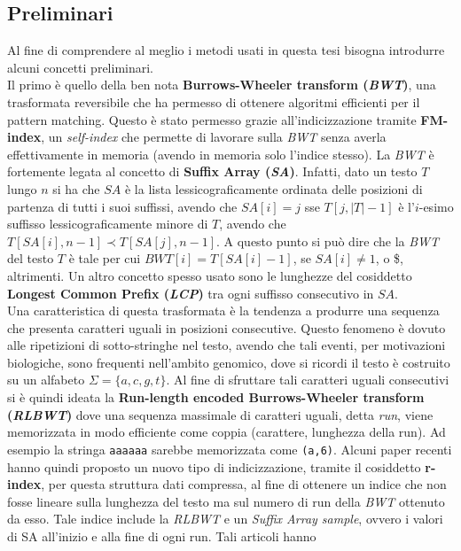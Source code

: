 \documentclass[a4paper,11pt, oneside]{article}
\begin{document}
\subsection*{Preliminari}
Al fine di comprendere al meglio i metodi usati in questa tesi bisogna
introdurre alcuni concetti preliminari.\\
Il primo è quello della ben nota \textbf{Burrows-Wheeler transform
  (\textit{BWT})}, una trasformata reversibile che ha permesso di ottenere
algoritmi efficienti per il pattern matching. Questo è stato permesso grazie
all'indicizzazione tramite 
\textbf{FM-index}, un \textit{self-index} che permette di lavorare sulla
\textit{BWT} senza averla effettivamente in memoria (avendo in memoria solo
l'indice stesso). La \textit{BWT} è fortemente legata al concetto di
\textbf{Suffix Array (\textit{SA})}. Infatti, dato un testo $T$ lungo $n$ si ha
che $SA$ è la lista lessicograficamente ordinata delle posizioni di partenza di
tutti i suoi suffissi, avendo che $SA[i]=j$ sse $T[j, |T|-1]$ è l'$i$-esimo
suffisso lessicograficamente minore di $T$, avendo che $T[SA[i],n-1] \prec
T[SA[j],n-1]$. A questo punto si può dire che la \textit{BWT} del testo $T$ è
tale per cui $BWT[i]=T[SA[i]-1]$, se $SA[i]\neq 1$, o \$, altrimenti. Un altro
concetto spesso usato 
sono le lunghezze del cosiddetto \textbf{Longest Common Prefix (\textit{LCP})}
tra ogni suffisso consecutivo in $SA$.\\
Una caratteristica di questa trasformata è la tendenza a
produrre una sequenza che presenta caratteri uguali in posizioni
consecutive. Questo fenomeno è dovuto alle ripetizioni di sotto-stringhe nel
testo, avendo che tali eventi, per motivazioni biologiche, sono frequenti
nell'ambito genomico, dove si ricordi il testo è costruito su un alfabeto
$\Sigma=\{a,c,g,t\}$. Al fine di sfruttare tali caratteri uguali consecutivi si
è quindi ideata la \textbf{Run-length encoded Burrows-Wheeler transform
  (\textit{RLBWT})} dove una sequenza massimale di caratteri uguali, detta
\textit{run}, viene memorizzata in modo efficiente come coppia (carattere,
lunghezza della run). Ad esempio la stringa \texttt{aaaaaa} sarebbe memorizzata
come \texttt{(a,6)}. Alcuni paper recenti hanno quindi proposto un nuovo tipo di
indicizzazione, tramite il cosiddetto \textbf{r-index}, per questa struttura
dati compressa, al fine di ottenere un indice che non fosse lineare sulla
lunghezza del testo ma sul numero di run della \textit{BWT} ottenuto da
esso. Tale indice include la \textit{RLBWT} e un \textit{Suffix Array sample},
ovvero i valori di SA all’inizio e alla fine di ogni run. Tali articoli hanno
\end{document}
